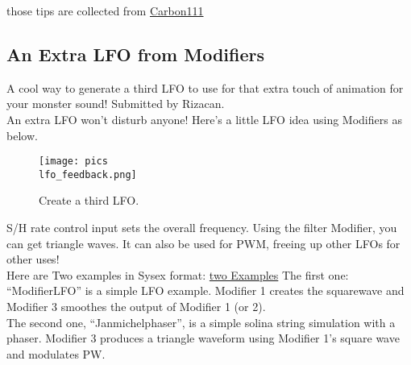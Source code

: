 those tips are collected from \href{https://www.carbon111.com/mwxt.html}{Carbon111}
\subsection{An Extra LFO from Modifiers}
A cool way to generate a third LFO to use for that extra touch of animation for your monster sound! Submitted by Rizacan.\\
An extra LFO won't disturb anyone! Here's a little LFO idea using Modifiers as below.
\bigskip %
%
\begin{figure}[ht!]
	\centering
	\texttt{[image: pics\\lfo\_feedback.png]}
	\caption{Create a third LFO.}
	\label{third_lfo}
\end{figure}
S/H rate control input sets the overall frequency. Using the filter Modifier, you can get triangle waves. It can also be used for PWM, freeing up other LFOs for other uses!\\
Here are Two examples in Sysex format: \href{https://www.carbon111.com/sysex.zip}{two Examples}
The first one: ``ModifierLFO'' is a simple LFO example. Modifier 1 creates the squarewave and Modifier 3 smoothes the output of Modifier 1 (or 2).\\
The second one, ``Janmichelphaser'', is a simple solina string simulation with a phaser. Modifier 3 produces a triangle waveform using Modifier 1's square wave and modulates PW.
